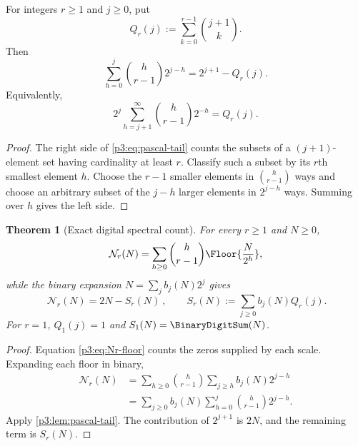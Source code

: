 \documentclass[11pt,oneside]{article}
\newtheorem{theorem}{Theorem}[section]
\theoremstyle{definition}
\theoremstyle{remark}
\begin{document}
\begin{lemma}\label{p3:lem:pascal-tail}
For integers $r\ge1$ and $j\ge0$, put
\begin{equation}\label{p3:eq:Qr}
  Q_r(j):=\sum_{k=0}^{r-1}\binom{j+1}{k}.
\end{equation}
Then
\begin{equation}\label{p3:eq:pascal-tail}
 \sum_{h=0}^{j}\binom h{r-1}2^{j-h}=2^{j+1}-Q_r(j).
\end{equation}
Equivalently,
\[
 2^j\sum_{h=j+1}^{\infty}\binom h{r-1}2^{-h}=Q_r(j).
\]
\end{lemma}

\begin{proof}
The right side of \eqref{p3:eq:pascal-tail} counts the subsets of a $(j+1)$-element set having cardinality at least $r$.  Classify such a subset by its $r$th smallest element $h$.  Choose the $r-1$ smaller elements in $\binom h{r-1}$ ways and choose an arbitrary subset of the $j-h$ larger elements in $2^{j-h}$ ways.  Summing over $h$ gives the left side.
\end{proof}

\begin{theorem}[Exact digital spectral count]\label{p3:thm:digital-count}
For every $r\ge1$ and $N\ge0$,
\begin{equation}\label{p3:eq:Nr-floor}
  \mathcal N_r(N)=\sum_{h\ge0}\binom h{r-1}\Floor{\frac N{2^h}},
\end{equation}
while the binary expansion $N=\sum_jb_j(N)2^j$ gives
\begin{equation}\label{p3:eq:Nr-digital}
  \boxed{\ \mathcal N_r(N)=2N-S_r(N)\ },
  \qquad
  S_r(N):=\sum_{j\ge0}b_j(N)Q_r(j).
\end{equation}
For $r=1$, $Q_1(j)=1$ and $S_1(N)=\BinaryDigitSum(N)$.
\end{theorem}

\begin{proof}
Equation \eqref{p3:eq:Nr-floor} counts the zeros supplied by each scale.  Expanding each floor in binary,
\begin{align*}
 \mathcal N_r(N)
 &=\sum_{h\ge0}\binom h{r-1}\sum_{j\ge h}b_j(N)2^{j-h}\\
 &=\sum_{j\ge0}b_j(N)
   \sum_{h=0}^{j}\binom h{r-1}2^{j-h}.
\end{align*}
Apply \cref{p3:lem:pascal-tail}.  The contribution of $2^{j+1}$ is $2N$, and the remaining term is $S_r(N)$.
\end{proof}
\end{document}
